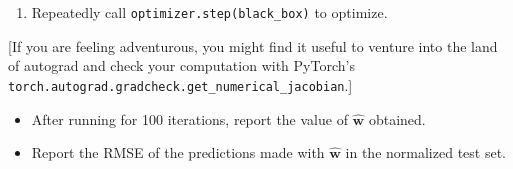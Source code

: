 \documentclass[submit]{harvardml}
\begin{document}
\begin{problem}[14pts]
\begin{enumerate}
\begin{verbatim}
    ...

    # Set the gradient of the variable.
    weights.grad = Tensor({numpy})

    return {objective}
\end{verbatim}

\item Repeatedly call \texttt{optimizer.step(black\_box)} to optimize.

\end{enumerate}

[If you are feeling adventurous, you might find it useful to venture
into the land of autograd and check your computation with PyTorch's
\texttt{torch.autograd.gradcheck.get\_numerical\_jacobian}.]

\begin{itemize}
\item After running for 100 iterations, report the value of $\hat{\mathbf{w}}$ obtained.
\item Report the RMSE of the predictions made with $\hat{\mathbf{w}}$ in the normalized test set.
\end{itemize}
\vspace{0.1cm}

\end{problem}
\end{document}
